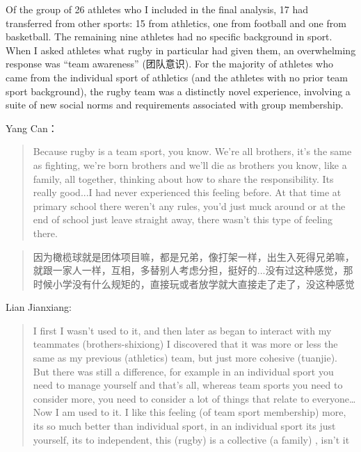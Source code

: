 
          Of the group of 26 athletes who I included in the final analysis, 17 had transferred from other sports: 15 from athletics, one from football and one from basketball.  The remaining nine athletes had no specific background in sport.  When I asked athletes what rugby in particular had given them, an overwhelming response was ``team awareness'' (团队意识).  For the majority of athletes who came from the individual sport of athletics (and the athletes with no prior team sport background), the rugby team was a distinctly novel experience, involving a suite of new social norms and requirements associated with group membership.

          Yang Can：
          \begin{quotation}
            Because rugby is a team sport, you know. We’re all brothers, it's the same as fighting, we’re born brothers and we’ll die as brothers you know, like a family, all together, thinking about how to share the responsibility. Its really good...I had never experienced this feeling before.  At that time at primary school there weren’t any rules, you’d just muck around or at the end of school just leave straight away, there wasn’t this type of feeling there.
          \end{quotation}

          \begin{CJK}{UTF8}{gbsn}
          \begin{quotation}
            因为橄榄球就是团体项目嘛，都是兄弟，像打架一样，出生入死得兄弟嘛，就跟一家人一样，互相，多替别人考虑分担，挺好的...没有过这种感觉，那时候小学没有什么规矩的，直接玩或者放学就大直接走了走了，没这种感觉
          \end{quotation}
          \end{CJK}

          Lian Jianxiang:
          \begin{quotation}
             I first I wasn’t used to it, and then later as began to interact with my teammates (brothers-shixiong) I discovered that it was more or less the same as my previous (athletics) team, but just more cohesive (tuanjie).  But there was still a difference, for example in an individual sport you need to manage yourself and that's all, whereas team sports you need to consider more, you need to consider a lot of things that relate to everyone…Now I am used to it. I like this feeling (of team sport membership) more, its so much better than individual sport, in an individual sport its just yourself, its to independent, this (rugby) is a collective  (a family) , isn’t it
          \end{quotation}

